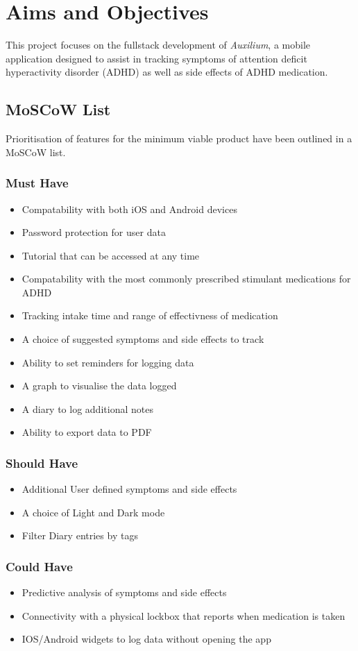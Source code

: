 \documentclass[../main.tex]{subfiles}
\begin{document}
\section{Aims and Objectives}
This project focuses on the fullstack development of \textit{Auxilium}, a mobile application designed to assist in tracking symptoms of attention deficit hyperactivity disorder (ADHD) as well as side effects of ADHD medication.
\subsection{MoSCoW List}
Prioritisation of features for the minimum viable product have been outlined in a MoSCoW list. 
\subsubsection*{Must Have}
\begin{itemize}
      \item Compatability with both iOS and Android devices
      \item Password protection for user data
      \item Tutorial that can be accessed at any time
      \item Compatability with the most commonly prescribed stimulant medications for ADHD
      \item Tracking intake time and range of effectivness of medication
      \item A choice of suggested symptoms and side effects to track
      \item Ability to set reminders for logging data
      \item A graph to visualise the data logged
      \item A diary to log additional notes
      \item Ability to export data to PDF
\end{itemize}
\subsubsection*{Should Have}
\begin{itemize}
   \item Additional User defined symptoms and side effects
   \item A choice of Light and Dark mode
   \item Filter Diary entries by tags
\end{itemize}
\subsubsection*{Could Have}
\begin{itemize}
   \item Predictive analysis of symptoms and side effects
   \item Connectivity with a physical lockbox that reports when medication is taken
   \item IOS/Android widgets to log data without opening the app
\end{itemize}
\end{document}
